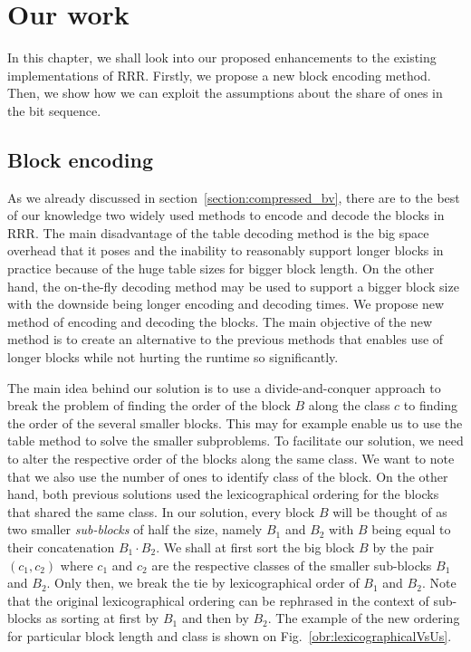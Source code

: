 \chapter{Our work}
\label{kap:kap3}

In this chapter, we shall look into our proposed enhancements to the existing
implementations of RRR. Firstly, we propose a new block encoding method.
Then, we show how we can exploit the assumptions about the share of ones
in the bit sequence.

\section{Block encoding}

As we already discussed in section~\ref{section:compressed_bv}, there are to
the best of our knowledge two widely used methods to encode and decode the
blocks in RRR. The main disadvantage of the table decoding method is the big space
overhead that it poses and the inability to reasonably support longer blocks
in practice because of the huge table sizes for bigger block length. On the
other hand, the on-the-fly decoding method may be used to support a bigger block size
with the downside being longer encoding and decoding times. We propose
new method of encoding and decoding the blocks. The main objective of the new method is
to create an alternative to the previous methods that enables use of longer blocks
while not hurting the runtime so significantly.

The main idea behind our solution is to use a divide-and-conquer approach to break
the problem of finding the order of the block $B$ along the class $c$ to finding the order
of the several smaller blocks. This may for example enable us to use the table method to solve the
smaller subproblems. To facilitate our solution, we need to alter the respective order of
the blocks along the same class. We want to note that we also use the number of ones to
identify class of the block. On the other hand, both previous solutions used the lexicographical ordering
for the blocks that shared the same class. In our solution, every block $B$ will be thought
of as two smaller \textit{sub-blocks} of half the size, namely $B_1$ and $B_2$ with $B$ being equal to their
concatenation $B_1\cdot B_2$. We shall at first sort the big block $B$ by the pair $(c_1, c_2)$
where $c_1$ and $c_2$ are the respective classes of the smaller sub-blocks $B_1$ and $B_2$. Only then,
we break the tie by lexicographical order of $B_1$ and $B_2$. Note that the original lexicographical
ordering can be rephrased in the context of sub-blocks as sorting at first by $B_1$ and then by
$B_2$. The example of the new ordering for particular block length and class is shown on
Fig.~\ref{obr:lexicographicalVsUs}.

